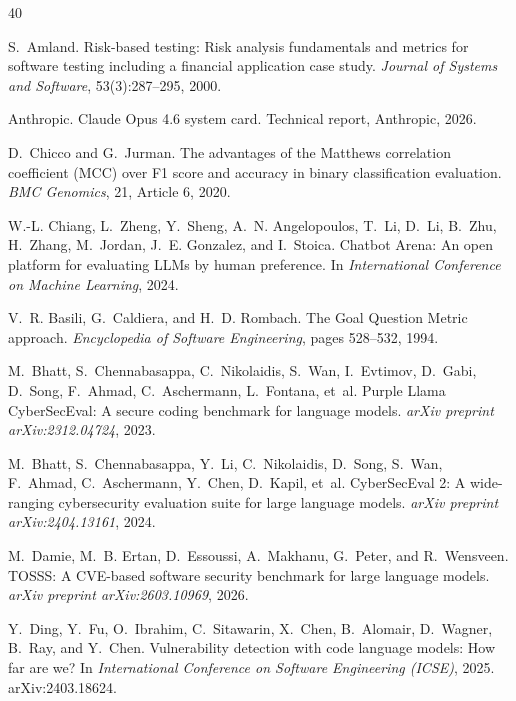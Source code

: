 \documentclass[10pt,twocolumn]{article}
\begin{document}
\begin{thebibliography}{40}

S.~Amland.
\newblock Risk-based testing: Risk analysis fundamentals and metrics for software testing including a financial application case study.
\newblock \emph{Journal of Systems and Software}, 53(3):287--295, 2000.

Anthropic.
\newblock Claude Opus 4.6 system card.
\newblock Technical report, Anthropic, 2026.

D.~Chicco and G.~Jurman.
\newblock The advantages of the Matthews correlation coefficient (MCC) over F1 score and accuracy in binary classification evaluation.
\newblock \emph{BMC Genomics}, 21, Article 6, 2020.

W.-L. Chiang, L.~Zheng, Y.~Sheng, A.~N. Angelopoulos, T.~Li, D.~Li, B.~Zhu, H.~Zhang, M.~Jordan, J.~E. Gonzalez, and I.~Stoica.
\newblock Chatbot Arena: An open platform for evaluating LLMs by human preference.
\newblock In \emph{International Conference on Machine Learning}, 2024.

V.~R. Basili, G.~Caldiera, and H.~D. Rombach.
\newblock The Goal Question Metric approach.
\newblock \emph{Encyclopedia of Software Engineering}, pages 528--532, 1994.

M.~Bhatt, S.~Chennabasappa, C.~Nikolaidis, S.~Wan, I.~Evtimov, D.~Gabi, D.~Song, F.~Ahmad, C.~Aschermann, L.~Fontana, et~al.
\newblock Purple Llama CyberSecEval: A secure coding benchmark for language models.
\newblock \emph{arXiv preprint arXiv:2312.04724}, 2023.

M.~Bhatt, S.~Chennabasappa, Y.~Li, C.~Nikolaidis, D.~Song, S.~Wan, F.~Ahmad, C.~Aschermann, Y.~Chen, D.~Kapil, et~al.
\newblock CyberSecEval 2: A wide-ranging cybersecurity evaluation suite for large language models.
\newblock \emph{arXiv preprint arXiv:2404.13161}, 2024.

M.~Damie, M.~B. Ertan, D.~Essoussi, A.~Makhanu, G.~Peter, and R.~Wensveen.
\newblock TOSSS: A CVE-based software security benchmark for large language models.
\newblock \emph{arXiv preprint arXiv:2603.10969}, 2026.

Y.~Ding, Y.~Fu, O.~Ibrahim, C.~Sitawarin, X.~Chen, B.~Alomair, D.~Wagner, B.~Ray, and Y.~Chen.
\newblock Vulnerability detection with code language models: How far are we?
\newblock In \emph{International Conference on Software Engineering (ICSE)}, 2025. arXiv:2403.18624.


\end{thebibliography}
\end{document}
